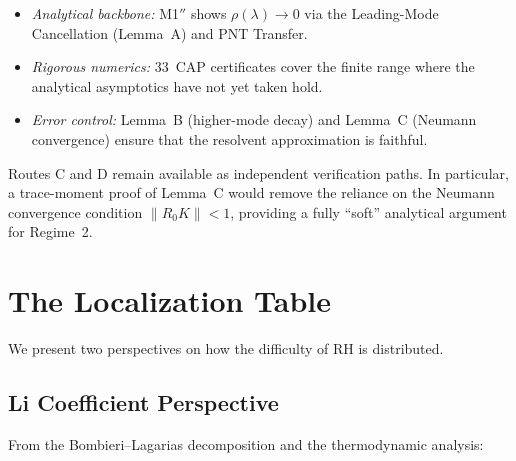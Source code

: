 \documentclass[12pt,a4paper]{article}
\theoremstyle{definition}
\theoremstyle{remark}
\begin{document}
\begin{itemize}
  \item \emph{Analytical backbone:} M1$''$ shows $\rho(\lambda) \to 0$ via the Leading-Mode Cancellation (Lemma~A) and PNT Transfer.
  \item \emph{Rigorous numerics:} 33~CAP certificates cover the finite range where the analytical asymptotics have not yet taken hold.
  \item \emph{Error control:} Lemma~B (higher-mode decay) and Lemma~C (Neumann convergence) ensure that the resolvent approximation is faithful.
\end{itemize}

\noindent Routes C and D remain available as independent verification paths. In particular, a trace-moment proof of Lemma~C would remove the reliance on the Neumann convergence condition $\|R_0 K\| < 1$, providing a fully ``soft'' analytical argument for Regime~2.


\section{The Localization Table}
\label{sec:localization}

We present two perspectives on how the difficulty of RH is distributed.

\subsection{Li Coefficient Perspective}

From the Bombieri--Lagarias decomposition and the thermodynamic analysis:
\end{document}
